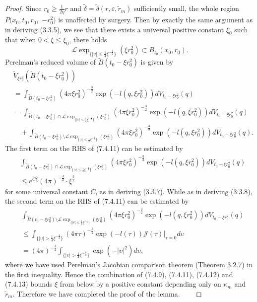 \begin{proof}
Since $r_0\geq \frac{1}{2\eta}r$ and
$\tilde{\delta}=\tilde{\delta}(r,\varepsilon,\widetilde{r}_m)$
sufficiently small, the whole region $P(x_0,t_0,r_0,$ $-r^2_0)$ is
unaffected by surgery. Then by exactly the same argument as in
deriving (3.3.5), we see that there exists a universal positive
constant $\xi_0$ such that when $0<\xi\leq\xi_0$, there holds \begin{equation}
\mathcal{L} \exp_{\{|\upsilon|\leq
\frac{1}{4}\xi^{-\frac{1}{2}}\}}(\xi r^2_0)\subset
B_{t_0}(x_0,r_0). %
\end{equation} Perelman's reduced volume of $\widetilde{B}(t_0-\xi r^2_0)$ is
given by
\begin{align}
& \widetilde{V}_{\xi r^2_0}(\widetilde{B}(t_0-\xi r^2_0))\\
&  = \int_{\widetilde{B}(t_0-\xi r^2_0)}(4\pi\xi
r^2_0)^{-\frac{3}{2}}\exp(-l(q,\xi r^2_0))dV_{t_0-\xi
r^2_0}(q)\nonumber\\
&  = \int_{\widetilde{B}(t_0-\xi r^2_0)\cap \mathcal{L}
\exp_{\{|\upsilon|\leq \frac{1}{4}\xi^{-\frac{1}{2}}\}}(\xi
r^2_0)}(4\pi\xi r^2_0)^{-\frac{3}{2}}\exp(-l(q,\xi
r^2_0))dV_{t_0-\xi r^2_0}(q)\nonumber\\
& \quad +\int_{\widetilde{B}(t_0-\xi r^2_0)\setminus
\mathcal{L}\exp_{\{|\upsilon|\leq
\frac{1}{4}\xi^{-\frac{1}{2}}\}}(\xi r^2_0)}(4\pi\xi
r^2_0)^{-\frac{3}{2}}\exp(-l(q,\xi r^2_0))dV_{t_0-\xi
r^2_0}(q).\nonumber
\end{align}  %
The first term on the RHS of (7.4.11) can be estimated by
\begin{align}
&\int_{\widetilde{B}(t_0-\xi r^2_0)\cap \mathcal{L}
\exp_{\{|\upsilon| \leq\frac{1}{4}\xi^{-\frac{1}{2}}\}}(\xi
r^2_0)}(4\pi\xi
r^2_0)^{-\frac{3}{2}}\exp(-l(q,\xi r^2_0))dV_{t_0-\xi r^2_0}(q)\\
&\leq e^{C\xi}(4\pi)^{-\frac{3}{2}}\cdot\xi^{\frac{3}{2}} \nonumber
\end{align}  %
for some universal constant $C$, as in deriving (3.3.7). While as
in deriving (3.3.8), the second term on the RHS of (7.4.11) can be
estimated by
\begin{align}
&  \int_{\widetilde{B}(t_0-\xi r^2_0)\setminus\mathcal{L}
\exp_{\{|\upsilon|\leq\frac{1}{4}\xi^{-\frac{1}{2}}\}}{(\xi
r^2_0)}}(4\pi \xi r^2_0)^{-\frac{3}{2}}\exp(-l(q,\xi
r^2_0))dV_{t_0-\xi r^2_0}(q)\\
&  \leq \int_{\{|\upsilon|>\frac{1}{4}\xi^{-\frac{1}{2}}\}}
(4\pi\tau)^{-\frac{3}{2}}\exp(-l(\tau))\mathcal{J}
(\tau)|_{\tau=0}d\upsilon\nonumber\\
& =(4\pi)^{-\frac{3}{2}}\int_{\{|\upsilon|>\frac{1}{4}
\xi^{-\frac{1}{2}}\}}\exp(-|\upsilon|^2)d\upsilon,\nonumber
\end{align}  %
where we have used Perelman's Jacobian comparison theorem (Theorem
3.2.7) in the first inequality. Hence the combination of (7.4.9),
(7.4.11), (7.4.12) and (7.4.13) bounds $\xi$ from below by a
positive constant depending only on $\kappa_m$ and
$\widetilde{r}_m$. Therefore we have completed the proof of the
lemma.
\mbox{ \ \ }\end{proof}


